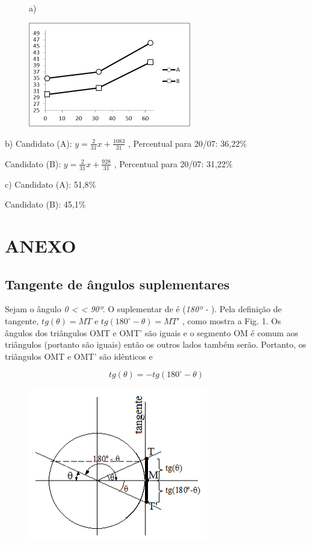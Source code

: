 \begin{respostas}{3}
\ansitem{}

\begin{figure}[H]
	a)
	
	\includegraphics[width=2.79in,height=1.8in]{capitulos/funcao_do_primeiro_grau/media/image64.png}
\end{figure}

b) Candidato (A):  \( y=\frac{2}{31}x+\frac{1083}{31} \) , Percentual para 20/07: 36,22$\%$ 

Candidato (B):  \( y=\frac{2}{31}x+\frac{928}{31} \) , Percentual para 20/07: 31,22$\%$ 

c) Candidato (A): 51,8$\%$ 

Candidato (B): 45,1$\%$ 
\end{respostas}

\section{ANEXO}

\subsection{Tangente de ângulos suplementares}

Sejam o ângulo \textit{0 <  < 90º}. O suplementar de   é (\textit{180º - }). Pela definição de tangente,  \( tg \left(  \theta  \right) =MT \)   e  \( tg \left( 180 ^{\circ} - \theta  \right) =MT' \)  , como mostra a Fig. 1. Os ângulos dos triângulos OMT e OMT’ são iguais e o segmento OM é comum aos triângulos (portanto são iguais) então os outros lados também serão. Portanto, os triângulos OMT e OMT’ são idênticos e 

 \[ tg \left(  \theta  \right) =-tg \left( 180 ^{\circ} - \theta  \right)  \] 

\begin{figure}[H]
	\begin{Center}
		\includegraphics[width=3.08in,height=2.64in]{capitulos/funcao_do_primeiro_grau/media/image65.png}
	\end{Center}
\end{figure}

